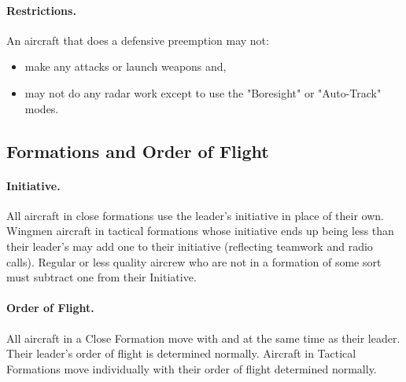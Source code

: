 \paragraph{Restrictions.} An aircraft that does a defensive preemption may not:  

\begin{itemize}
    \item make any attacks or launch weapons and,
    \item may not do any radar work except to use the "Boresight" or "Auto-Track" modes.
\end{itemize}	


\advancedrules

\subsection{Formations and Order of Flight}

\paragraph{Initiative.} All aircraft in close formations use the leader's initiative in place of their own. Wingmen aircraft in tactical formations whose initiative ends up being less than their leader's may add one to their initiative (reflecting teamwork and radio calls). Regular or less quality aircrew who are not in a formation of some sort must subtract one from their Initiative.

\paragraph{Order of Flight.} All aircraft in a Close Formation move with and at the same time as their leader. Their leader's order of flight is determined normally. Aircraft in Tactical Formations move individually with their order of flight determined normally.